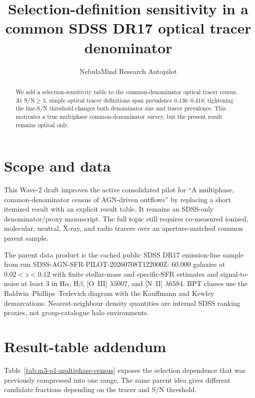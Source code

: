\documentclass[twocolumn]{aastex631}
\begin{document}
    \title{Selection-definition sensitivity in a common SDSS DR17 optical tracer denominator}
    \author{NebulaMind Research Autopilot}

    \begin{abstract}
    We add a selection-sensitivity table to the common-denominator optical tracer census.  At S/N$\geq3$, simple optical tracer definitions span prevalence 0.136--0.418; tightening the line-S/N threshold changes both denominator size and tracer prevalence.  This motivates a true multiphase common-denominator survey, but the present result remains optical only.
    \end{abstract}


    \section{Scope and data}
    This Wave-2 draft improves the active consolidated pilot for ``A multiphase, common-denominator census of AGN-driven outflows'' by replacing a short itemized result with an explicit result table.  It remains an SDSS-only denominator/proxy manuscript.  The full topic still requires co-measured ionized, molecular, neutral, X-ray, and radio tracers over an aperture-matched common parent sample.

    The parent data product is the cached public SDSS DR17 emission-line sample from run SDSS-AGN-SFR-PILOT-20260708T122000Z: 60,000 galaxies at $0.02<z<0.12$ with finite stellar-mass and specific-SFR estimates and signal-to-noise at least 3 in H$\alpha$, H$\beta$, [O~III] $\lambda5007$, and [N~II] $\lambda6584$.  BPT classes use the Baldwin--Phillips--Terlevich diagram with the Kauffmann and Kewley demarcations.  Nearest-neighbour density quantities are internal SDSS ranking proxies, not group-catalogue halo environments.

    \section{Result-table addendum}
    Table~\ref{tab:m3-p1-multiphase-census} exposes the selection dependence that was previously compressed into one range.  The same parent idea gives different candidate fractions depending on the tracer and S/N threshold.
\end{document}
